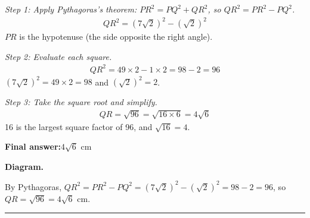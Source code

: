 \documentclass[11pt]{article}
\begin{document}
\textit{Step 1: Apply Pythagoras's theorem: \(PR^2 = PQ^2 + QR^2\), so \(QR^2 = PR^2 - PQ^2\).}
\[\begin{gathered}
QR^2 = (7\sqrt{2})^2 - (\sqrt{2})^2
\end{gathered}\]
\( PR \) is the hypotenuse (the side opposite the right angle).

\textit{Step 2: Evaluate each square.}
\[\begin{gathered}
QR^2 = 49 \times 2 - 1 \times 2 = 98 - 2 = 96
\end{gathered}\]
\( (7\sqrt{2})^2 = 49 \times 2 = 98 \) and \( (\sqrt{2})^2 = 2 \).

\textit{Step 3: Take the square root and simplify.}
\[\begin{gathered}
QR = \sqrt{96} = \sqrt{16 \times 6} = 4\sqrt{6}
\end{gathered}\]
16 is the largest square factor of 96, and \( \sqrt{16} = 4 \).

\begin{answerbox}
\textbf{Final answer:}\quad \(\displaystyle 4\sqrt{6}\) cm
\end{answerbox}
\textbf{Diagram.}

\begin{center}
\end{center}
\small By Pythagoras, $QR^{2}=PR^{2}-PQ^{2}=(7\sqrt2)^2-(\sqrt2)^2=98-2=96$, so $QR=\sqrt{96}=4\sqrt6$ cm.\normalsize

\medskip\hrule
\end{document}
